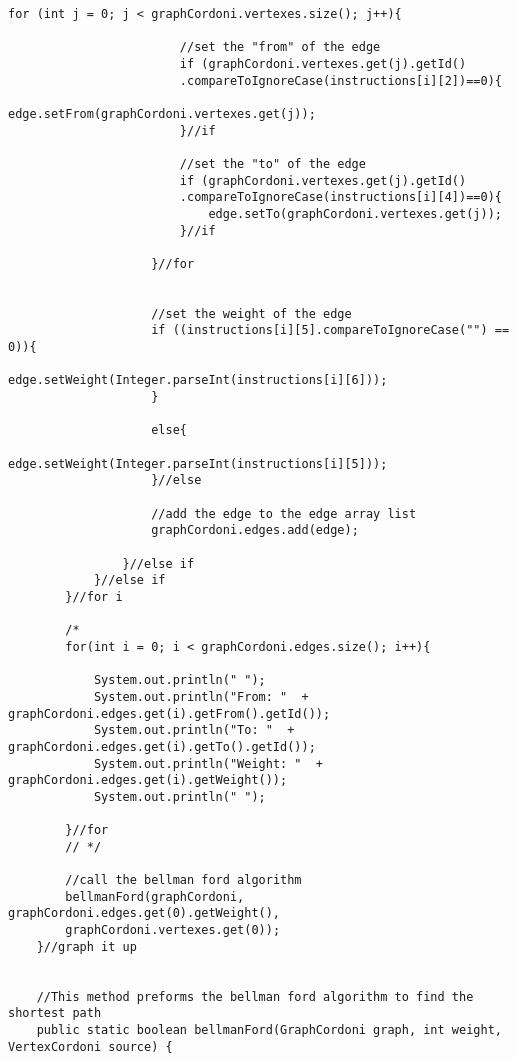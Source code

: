 \documentclass[letterpaper, 10pt,DIV=13]{scrartcl}
\numberwithin{equation}{section} %
\numberwithin{figure}{section} %
\numberwithin{table}{section} %
\begin{document}
\begin{lstlisting}[frame=single, ]
                    for (int j = 0; j < graphCordoni.vertexes.size(); j++){

                        //set the "from" of the edge 
                        if (graphCordoni.vertexes.get(j).getId()
                        .compareToIgnoreCase(instructions[i][2])==0){
                            edge.setFrom(graphCordoni.vertexes.get(j));
                        }//if

                        //set the "to" of the edge 
                        if (graphCordoni.vertexes.get(j).getId()
                        .compareToIgnoreCase(instructions[i][4])==0){
                            edge.setTo(graphCordoni.vertexes.get(j));
                        }//if
                    
                    }//for
                    
                    
                    //set the weight of the edge
                    if ((instructions[i][5].compareToIgnoreCase("") == 0)){
                        edge.setWeight(Integer.parseInt(instructions[i][6]));
                    }
                    
                    else{
                        edge.setWeight(Integer.parseInt(instructions[i][5]));
                    }//else

                    //add the edge to the edge array list
                    graphCordoni.edges.add(edge);

                }//else if
            }//else if
        }//for i

        /*
        for(int i = 0; i < graphCordoni.edges.size(); i++){

            System.out.println(" ");
            System.out.println("From: "  + graphCordoni.edges.get(i).getFrom().getId());
            System.out.println("To: "  + graphCordoni.edges.get(i).getTo().getId());
            System.out.println("Weight: "  + graphCordoni.edges.get(i).getWeight());
            System.out.println(" ");

        }//for
        // */

        //call the bellman ford algorithm
        bellmanFord(graphCordoni, graphCordoni.edges.get(0).getWeight(),
        graphCordoni.vertexes.get(0));
    }//graph it up 


    //This method preforms the bellman ford algorithm to find the shortest path
    public static boolean bellmanFord(GraphCordoni graph, int weight, VertexCordoni source) {
 

\end{lstlisting}
\end{document}
